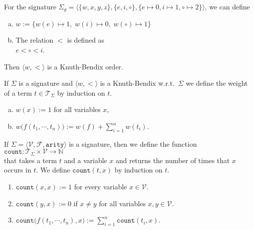 \example
For the signature
$\Sigma_g = \bigl\langle  \{ w, x, y, z \}, \{ e, i, \circ \}, \{ e \mapsto 0, i \mapsto 1, \circ \mapsto 2 \}\bigr\rangle$,
we can define
\begin{enumerate}[(a)]
\item $w := \{ w(e) \mapsto 1,\; w(i) \mapsto 0,\; w(\circ) \mapsto 1 \}$
\item The relation $<$ is defined as
      \\[0.2cm]
      \hspace*{1.3cm}
      $e < \circ < i$.
\end{enumerate}
Then $\langle w, < \rangle$ is a Knuth-Bendix order. \eox

\begin{Definition}
  If $\Sigma$ is a signature and $\langle w, < \rangle$ is a Knuth-Bendix w.r.t.~$\Sigma$ we define the  weight
  of a term $t \in \mathcal{T}_\Sigma$ by induction on $t$.
  \begin{enumerate}[(a)]
  \item $w(x) := 1$ for all variables $x$,
  \item $w\bigl(f(t_1,\cdots,t_n)\bigr) := w(f) + \sum\limits_{i=1}^n w(t_i)$. \eox
  \end{enumerate}
\end{Definition}

\begin{Definition}[Count]
    If $\Sigma = \langle \mathcal{V}, \mathcal{F}, \mathtt{arity} \rangle$ is a signature, then
    we define the function
    \\[0.2cm]
    \hspace*{1.3cm}
    $\texttt{count}: \mathcal{T}_\Sigma \times \mathcal{V} \rightarrow \mathbb{N}$
    \\[0.2cm]
    that takes a term $t$ and a variable $x$ and returns the number of times that $x$ occurs in $t$.
    We define $\texttt{count}(t,x)$ by induction on $t$.
    \begin{enumerate}
    \item $\texttt{count}(x, x) := 1$ \quad for every variable $x \in \mathcal{V}$.
    \item $\texttt{count}(y, x) := 0$ \quad if $x \not= y$ for all variables $x,y \in \mathcal{V}$.
    \item $\texttt{count}\bigl(f(t_1,\cdots,t_n), x\bigr) := \sum\limits_{i=1}^n \texttt{count}(t_i, x)$. \eox
    \end{enumerate}
\end{Definition}

